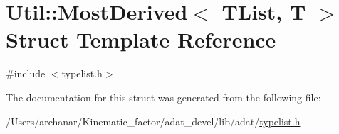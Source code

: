 \hypertarget{structUtil_1_1TL_1_1MostDerived}{}\section{Util\+:\+:Most\+Derived$<$ T\+List, T $>$ Struct Template Reference}
\label{structUtil_1_1TL_1_1MostDerived}


{\ttfamily \#include $<$typelist.\+h$>$}



The documentation for this struct was generated from the following file\+:\begin{DoxyCompactItemize}
\item 
/\+Users/archanar/\+Kinematic\+\_\+factor/adat\+\_\+devel/lib/adat/\mbox{\hyperlink{lib_2adat_2typelist_8h}{typelist.\+h}}\end{DoxyCompactItemize}
